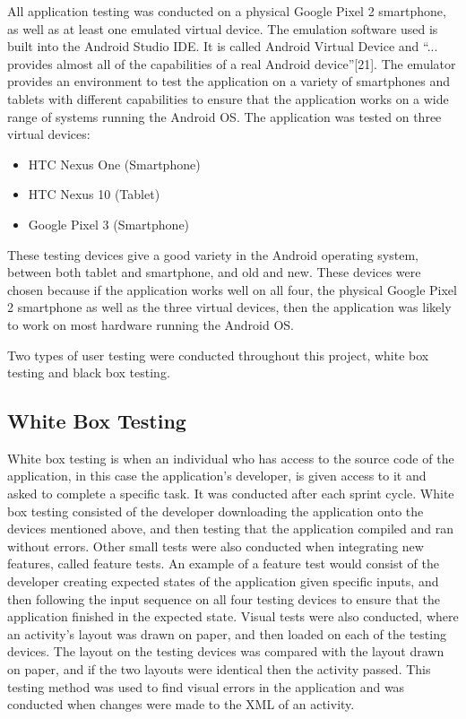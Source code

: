 \documentclass{article}
\begin{document}
All application testing was conducted on a physical Google Pixel 2 smartphone, as well as at least one emulated virtual device. The emulation software used is built into the Android Studio IDE. It is called Android Virtual Device and ``... provides almost all of the capabilities of a real Android device''[21]. The emulator provides an environment to test the application on a variety of smartphones and tablets with different capabilities to ensure that the application works on a wide range of systems running the Android OS. The application was tested on three virtual devices: 

\begin{itemize}
	\item HTC Nexus One (Smartphone)
	\item HTC Nexus 10 (Tablet)
	\item Google Pixel 3 (Smartphone)
\end{itemize}

These testing devices give a good variety in the Android operating system, between both tablet and smartphone, and old and new. These devices were chosen because if the application works well on all four, the physical Google Pixel 2 smartphone as well as the three virtual devices, then the application was likely to work on most hardware running the Android OS. \par

Two types of user testing were conducted throughout this project, white box testing and black box testing. \par 

\subsection{White Box Testing}

White box testing is when an individual who has access to the source code of the application, in this case the application's developer, is given access to it and asked to complete a specific task. It was conducted after each sprint cycle. White box testing consisted of the developer downloading the application onto the devices mentioned above, and then testing that the application compiled and ran without errors. Other small tests were also conducted when integrating new features, called feature tests. An example of a feature test would consist of the developer creating expected states of the application given specific inputs, and then following the input sequence on all four testing devices to ensure that the application finished in the expected state. Visual tests were also conducted, where an activity's layout was drawn on paper, and then loaded on each of the testing devices. The layout on the testing devices was compared with the layout drawn on paper, and if the two layouts were identical then the activity passed. This testing method was used to find visual errors in the application and was conducted when changes were made to the XML of an activity. \par
\end{document}
